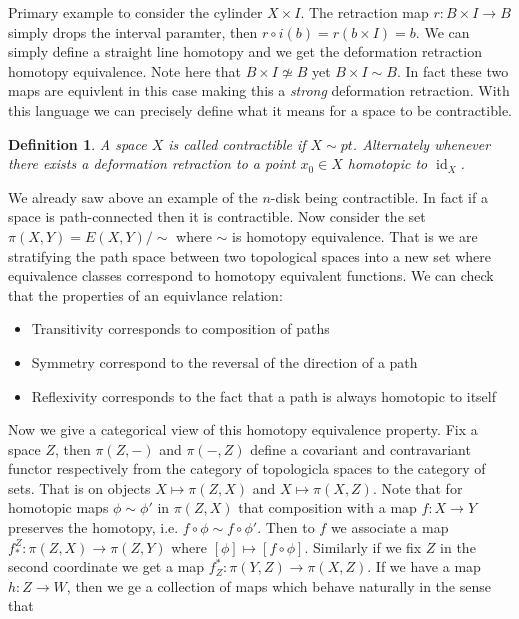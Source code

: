 \documentclass[40pt]{article}
\newtheorem{definition}{Definition}[section]
\DeclareMathOperator{\id}{\text{id}}
\begin{document}
	Primary example to consider the cylinder $X \times I$. The retraction map $r : B \times I \rightarrow B$ simply drops the interval paramter, then $r \circ i ( b) = r(b \times I) = b$. We can simply define a straight line homotopy and we get the deformation retraction homotopy equivalence. Note here that $B \times I \not \simeq B$ yet $B \times I \sim B$. 	In fact these two maps are equivlent in this case making this a \emph{strong} deformation retraction. With this language we can precisely define what it means for a space to be contractible.
	\begin{definition}
		A space $X$ is called contractible if $X \sim pt$. Alternately whenever there exists a deformation retraction to a point $x_0 \in X$ homotopic to $\id_X$. 
	\end{definition}
	We already saw above an example of the $n$-disk being contractible. In fact if a space is path-connected then it is contractible. Now consider the set $\pi(X,Y) = E(X,Y)/\sim$ where $\sim$ is homotopy equivalence. That is we are stratifying the path space between two topological spaces into a new set where equivalence classes correspond to homotopy equivalent functions. We can check that the properties of an equivlance relation:
	\begin{itemize}
		\item Transitivity corresponds to composition of paths
		\item Symmetry correspond to the reversal of the direction of a path
		\item Reflexivity corresponds to the fact that a path is always homotopic to itself
	\end{itemize}
	Now we give a categorical view of this homotopy equivalence property. Fix a space $Z$, then $\pi(Z, -)$ and $\pi(-,Z)$ define a covariant and contravariant functor respectively from the category of topologicla spaces to the category of sets. That is on objects $X \mapsto \pi(Z,X)$ and $X \mapsto \pi(X,Z)$. Note that for homotopic maps $\phi \sim \phi'$ in $\pi(Z,X)$ that composition with a map $f: X \rightarrow Y$ preserves the homotopy, i.e. $f \circ \phi \sim f \circ \phi '$. Then to $f$ we associate a map $f_*^Z:\pi(Z,X)\rightarrow\pi(Z,Y)$ where $[\phi] \mapsto [f \circ \phi]$. Similarly if we fix $Z$ in the second coordinate we get a map $f^*_Z : \pi(Y,Z) \rightarrow \pi(X,Z)$. If we have a map $h: Z \rightarrow W$, then we ge a collection of maps which behave naturally in the sense that 
\end{document}
